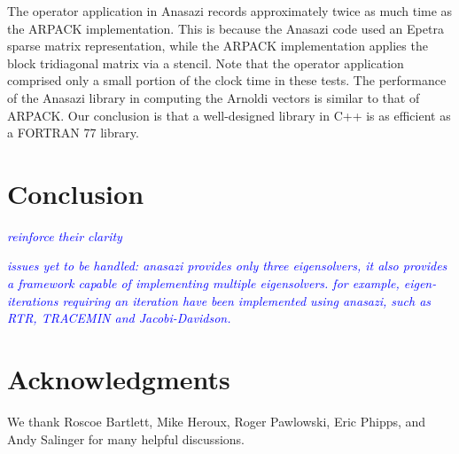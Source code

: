 \documentclass[acmtoms]{acmtrans2m}
\newcommand{\cbcomm}[1]{\textcolor{blue}{\emph{#1}}}
\begin{document}
The operator application in Anasazi records approximately twice as much time as the ARPACK
implementation. This is because the Anasazi code used an Epetra sparse matrix
representation, while the ARPACK implementation applies the block tridiagonal
matrix via a stencil. Note that the operator application comprised only a small
portion of the clock time in these tests. The performance of the Anasazi library in
computing the Arnoldi vectors is similar to that of ARPACK. Our conclusion is that a
well-designed library in C++ is as efficient as a FORTRAN 77 library.

\section{Conclusion}

\cbcomm{reinforce their clarity}

\cbcomm{issues yet to be handled: anasazi provides only three
eigensolvers, it also provides a framework capable of implementing
multiple eigensolvers. for example, eigen-iterations requiring an
iteration have been implemented using anasazi, such as RTR, TRACEMIN
and Jacobi-Davidson.}

\section{Acknowledgments}
We thank Roscoe Bartlett, Mike Heroux, Roger Pawlowski, Eric Phipps,
and Andy Salinger for many helpful discussions.





\begin{received}
\end{received}
\end{document}
